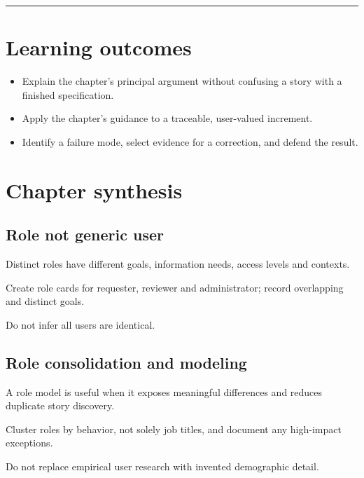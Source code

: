 \documentclass[11pt,letterpaper]{article}
\begin{document}
\tableofcontents\medskip\noindent\rule{\linewidth}{0.4pt}\medskip
\section{Learning outcomes}
\begin{itemize}[leftmargin=*,itemsep=2pt]
\item Explain the chapter's principal argument without confusing a story with a finished specification.
\item Apply the chapter's guidance to a traceable, user-valued increment.
\item Identify a failure mode, select evidence for a correction, and defend the result.
\end{itemize}
\section{Chapter synthesis}
\subsection{Role not generic user}
Distinct roles have different goals, information needs, access levels and contexts.

\begin{tcolorbox}[colback=tealback,colframe=navy,title={Engineering translation},breakable]
Create role cards for requester, reviewer and administrator; record overlapping and distinct goals.

\end{tcolorbox}
\begin{tcolorbox}[colback=amberback,colframe=navy,title={Failure mode to watch},breakable]
Do not infer all users are identical.

\end{tcolorbox}
\subsection{Role consolidation and modeling}
A role model is useful when it exposes meaningful differences and reduces duplicate story discovery.

\begin{tcolorbox}[colback=tealback,colframe=navy,title={Engineering translation},breakable]
Cluster roles by behavior, not solely job titles, and document any high-impact exceptions.

\end{tcolorbox}
\begin{tcolorbox}[colback=amberback,colframe=navy,title={Failure mode to watch},breakable]
Do not replace empirical user research with invented demographic detail.

\end{tcolorbox}
\end{document}
